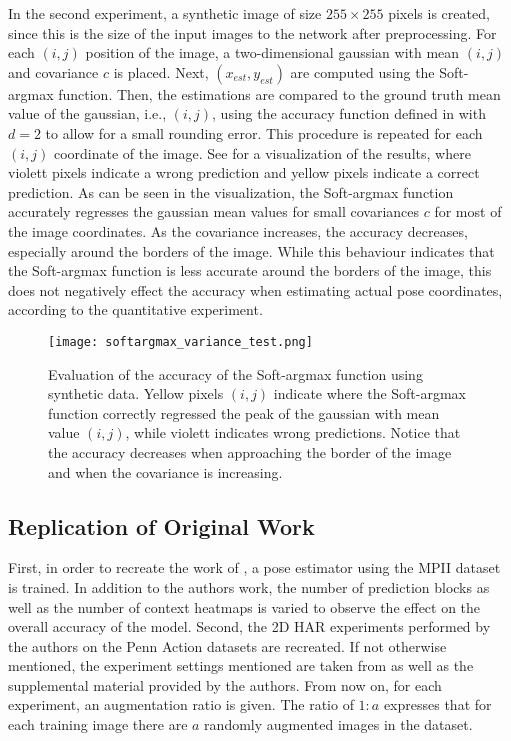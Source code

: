 In the second experiment, a synthetic image of size $255 \times 255$ pixels is created, since this is the size of the input images to the network after preprocessing.
For each $(i,j)$ position of the image, a two-dimensional gaussian with mean $(i,j)$ and covariance $c$ is placed.
Next, $(x_{est},y_{est})$ are computed using the Soft-argmax function.
Then, the estimations are compared to the ground truth mean value of the gaussian, i.e., $(i,j)$, using the accuracy function defined in  with $d=2$ to allow for a small rounding error.
This procedure is repeated for each $(i,j)$ coordinate of the image.
See  for a visualization of the results, where violett pixels indicate a wrong prediction and yellow pixels indicate a correct prediction.
As can be seen in the visualization, the Soft-argmax function accurately regresses the gaussian mean values for small covariances $c$ for most of the image coordinates.
As the covariance increases, the accuracy decreases, especially around the borders of the image.
While this behaviour indicates that the Soft-argmax function is less accurate around the borders of the image, this does not negatively effect the accuracy when estimating actual pose coordinates, according to the quantitative experiment.

\begin{figure}[htb!]
    \centering
    \texttt{[image: softargmax\_variance\_test.png]}
    \caption{Evaluation of the accuracy of the Soft-argmax function using synthetic data. Yellow pixels $(i,j)$ indicate where the Soft-argmax function correctly regressed the peak of the gaussian with mean value $(i,j)$, while violett indicates wrong predictions. Notice that the accuracy decreases when approaching the border of the image and when the covariance is increasing. }
    \label{fig:softargmax_variance_test}
\end{figure}

\subsection{Replication of Original Work}
\label{sec:exp-replication}

First, in order to recreate the work of \cite{luvizon_2d/3d_2018}, a pose estimator using the MPII dataset is trained.
In addition to the authors work, the number of prediction blocks as well as the number of context heatmaps is varied to observe the effect on the overall accuracy of the model.
Second, the 2D HAR experiments performed by the authors on the Penn Action datasets are recreated.
If not otherwise mentioned, the experiment settings mentioned are taken from \cite{luvizon_2d/3d_2018} as well as the supplemental material provided by the authors.
From now on, for each experiment, an augmentation ratio is given.
The ratio of $1:a$ expresses that for each training image there are $a$ randomly augmented images in the dataset.

